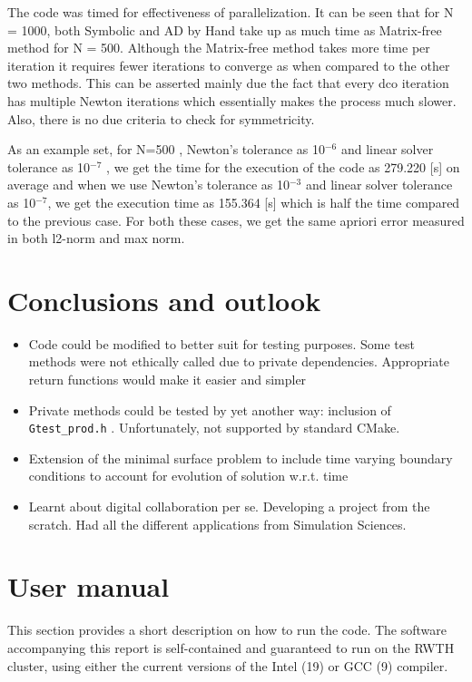 \documentclass[11pt]{scrartcl}
\begin{document}
The code was timed for effectiveness of parallelization. It can be seen that for N = 1000, both Symbolic and AD by Hand take up as much time as Matrix-free method for N = 500. Although the Matrix-free method takes more time per iteration it requires fewer iterations to converge as when compared to the other two methods.
This can be asserted mainly due the fact that every dco iteration has multiple Newton iterations which essentially makes the process much slower. Also, there is no due criteria to check for symmetricity.


As an example set, for N=500 , Newton's tolerance as 10$^{-6}$ and linear solver tolerance as 10$^{-7}$ , we get the time for the execution of the code as 279.220 [s] on average and when we use Newton's tolerance as 10$^{-3}$ and linear solver tolerance as 10$^{-7}$, we get the execution time as 155.364 [s] which is half the time compared to the previous case. For both these cases, we get the same apriori error measured in both l2-norm and max norm.


\section{Conclusions and outlook}
\begin{itemize}
	\item {Code could be modified to better suit for testing purposes. Some test methods were not ethically called due to private dependencies. Appropriate return functions would make it easier and simpler}
	\item {Private methods could be tested by yet another way: inclusion of \texttt{Gtest\_prod.h} . Unfortunately, not supported by standard CMake.}
	\item {Extension of the minimal surface problem to include time varying boundary conditions to account for evolution of solution w.r.t. time}
	\item {Learnt about digital collaboration per se. Developing a project from the scratch. Had all the different applications from Simulation Sciences.}
\end{itemize}


%


\clearpage
\appendix
\section{User manual}
This section provides a short description on how to run the code. The software accompanying this report is self-contained and guaranteed to run on the RWTH cluster, using either the current versions of the Intel (19) or GCC (9) compiler.
\end{document}
